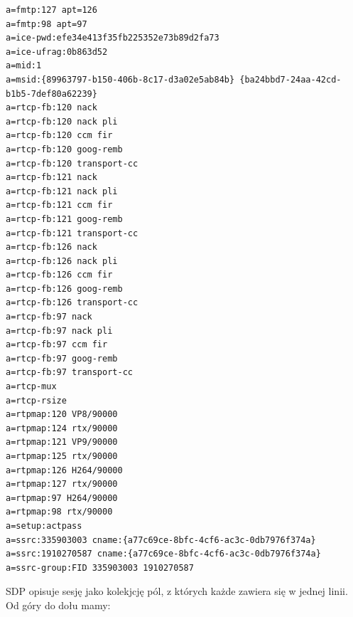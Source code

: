 \begin{lstlisting}[label=list:call-doc-1, caption=Opis oferty połączenia SDP,
basicstyle=\footnotesize \ttfamily, showtabs=true, tabsize=4]
a=fmtp:127 apt=126
a=fmtp:98 apt=97
a=ice-pwd:efe34e413f35fb225352e73b89d2fa73
a=ice-ufrag:0b863d52
a=mid:1
a=msid:{89963797-b150-406b-8c17-d3a02e5ab84b} {ba24bbd7-24aa-42cd-b1b5-7def80a62239}
a=rtcp-fb:120 nack
a=rtcp-fb:120 nack pli
a=rtcp-fb:120 ccm fir
a=rtcp-fb:120 goog-remb
a=rtcp-fb:120 transport-cc
a=rtcp-fb:121 nack
a=rtcp-fb:121 nack pli
a=rtcp-fb:121 ccm fir
a=rtcp-fb:121 goog-remb
a=rtcp-fb:121 transport-cc
a=rtcp-fb:126 nack
a=rtcp-fb:126 nack pli
a=rtcp-fb:126 ccm fir
a=rtcp-fb:126 goog-remb
a=rtcp-fb:126 transport-cc
a=rtcp-fb:97 nack
a=rtcp-fb:97 nack pli
a=rtcp-fb:97 ccm fir
a=rtcp-fb:97 goog-remb
a=rtcp-fb:97 transport-cc
a=rtcp-mux
a=rtcp-rsize
a=rtpmap:120 VP8/90000
a=rtpmap:124 rtx/90000
a=rtpmap:121 VP9/90000
a=rtpmap:125 rtx/90000
a=rtpmap:126 H264/90000
a=rtpmap:127 rtx/90000
a=rtpmap:97 H264/90000
a=rtpmap:98 rtx/90000
a=setup:actpass
a=ssrc:335903003 cname:{a77c69ce-8bfc-4cf6-ac3c-0db7976f374a}
a=ssrc:1910270587 cname:{a77c69ce-8bfc-4cf6-ac3c-0db7976f374a}
a=ssrc-group:FID 335903003 1910270587
\end{lstlisting}

\cite{rfc8866} SDP opisuje sesję jako kolekjcję pól, z których każde zawiera się w jednej linii. Od góry do dołu mamy:

